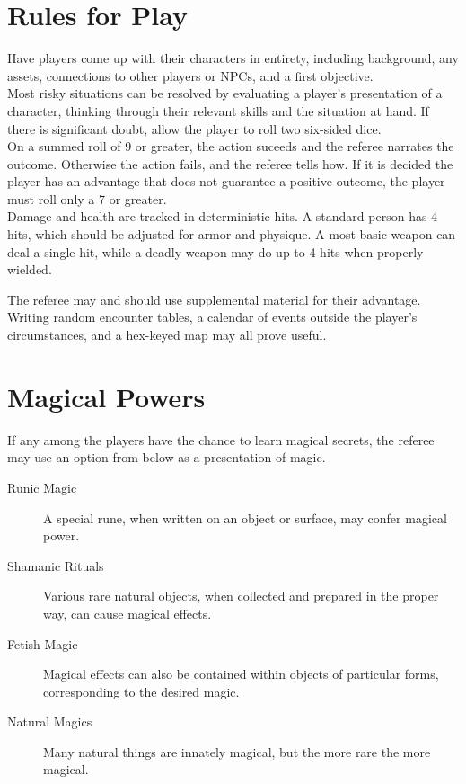 \documentclass[a4paper]{article}
\begin{document}
\begin{multicols}{2}
\appendix
\section{Rules for Play}

Have players come up with their characters in entirety, including background, any assets, connections to other players or NPCs, and a first objective. \\

Most risky situations can be resolved by evaluating a player's presentation of a character, thinking through their relevant skills and the situation at hand. If there is significant doubt, allow the player to roll two six-sided dice. \\

On a summed roll of 9 or greater, the action suceeds and the referee narrates the outcome. Otherwise the action fails, and the referee tells how. If it is decided the player has an advantage that does not guarantee a positive outcome, the player must roll only a 7 or greater. \\

Damage and health are tracked in deterministic hits. A standard person has 4 hits, which should be adjusted for armor and physique. A most basic weapon can deal a single hit, while a deadly weapon may do up to 4 hits when properly wielded.

The referee may and should use supplemental material for their advantage. Writing random encounter tables, a calendar of events outside the player's circumstances, and a hex-keyed map may all prove useful.

\section{Magical Powers}

If any among the players have the chance to learn magical secrets, the referee may use an option from below as a presentation of magic.

\begin{description}
\item[Runic Magic] A special rune, when written on an object or surface, may confer magical power. 
\item[Shamanic Rituals] Various rare natural objects, when collected and prepared in the proper way, can cause magical effects.
\item[Fetish Magic] Magical effects can also be contained within objects of particular forms, corresponding to the desired magic.
\item[Natural Magics] Many natural things are innately magical, but the more rare the more magical.
\end{description}


\end{multicols}
\end{document}
